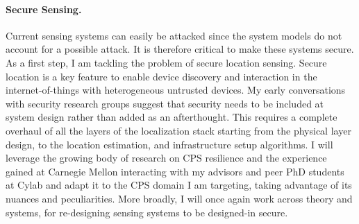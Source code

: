 \documentclass[10pt]{article}
\begin{document}
\paragraph{Secure Sensing. }
Current sensing systems can easily be attacked since the system models do not account for a possible attack. It is therefore critical to make these systems secure. As a first step, I am tackling the problem of secure location sensing. Secure location is a key feature to enable device discovery and interaction in the internet-of-things with heterogeneous untrusted devices. My early conversations with  security research groups suggest that security needs to be included at system design rather than added as an afterthought. This requires a complete overhaul of all the layers of the localization stack starting from the physical layer design, to the location estimation, and infrastructure setup algorithms. I will leverage the growing body of research on CPS resilience and the experience gained at Carnegie Mellon interacting with my advisors and peer PhD students at Cylab and adapt it to the CPS domain I am targeting, taking advantage of its nuances and peculiarities.  More broadly, I will once again work across theory and systems, for re-designing sensing systems to be designed-in secure. 

\end{document}
